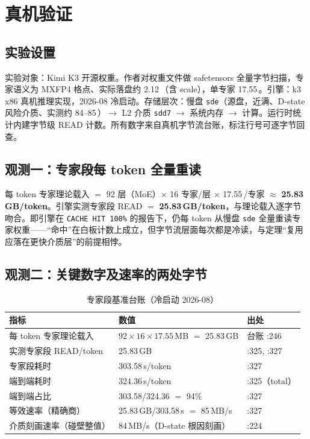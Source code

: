 \documentclass[11pt]{ctexart}
\begin{document}
\section{真机验证}

\subsection{实验设置}

实验对象：Kimi K3 开源权重\cite{k3}。作者对权重文件做 safetensors 全量字节扫描，专家语义为 MXFP4 格点、实际落盘约 2.12\,（含 scale）\cite{ledger}，单专家 17.55\,。引擎：k3 x86 真机推理实现，2026-08 冷启动。存储层次：慢盘 \texttt{sde}（源盘，近满、D-state 风险介质、实测约 84--85\,）$\to$ L2 介质 \texttt{sdd7} $\to$ 系统内存 $\to$ 计算。运行时统计内建字节级 READ 计数。所有数字来自真机字节流台账\cite{ledger}，标注行号可逐字节回查。

\subsection{观测一：专家段每 token 全量重读}

每 token 专家理论载入 $=$ 92 层（MoE）$\times$ 16 专家/层 $\times$ 17.55\,/专家 $\approx$ \textbf{25.83\,GB/token}。引擎实测专家段 READ $=$ \textbf{25.83\,GB/token}，与理论载入逐字节吻合。即引擎在 \texttt{CACHE HIT 100\%} 的报告下，仍每 token 从慢盘 \texttt{sde} 全量重读专家权重——“命中”在白板计数上成立，但字节流层面每次都是冷读，与定理“复用应落在更快介质层”的前提相悖。

\subsection{观测二：关键数字及速率的两处字节}

\begin{table}[htbp]
\centering
\caption{专家段基准台账（冷启动 2026-08）}
\label{tab:ledger}
\begin{tabular}{lll}
\toprule
指标 & 数值 & 出处 \\
\midrule
每 token 专家理论载入 & $92\times16\times17.55$\,MB $=$ 25.83\,GB & 台账 :246 \\
实测专家段 READ/token & 25.83\,GB & :325, :327 \\
专家段耗时 & 303.58\,s/token & :327 \\
端到端耗时 & 324.36\,s/token & :325（total） \\
端到端占比 & 303.58/324.36 $=$ 94\% & :327 \\
等效速率（精确商） & 25.83\,GB/303.58\,s $=$ 85\,MB/s & :327 \\
介质刻画速率（碰壁整值） & 84\,MB/s（D-state 根因刻画） & :224 \\
\bottomrule
\end{tabular}
\end{table}
\end{document}
